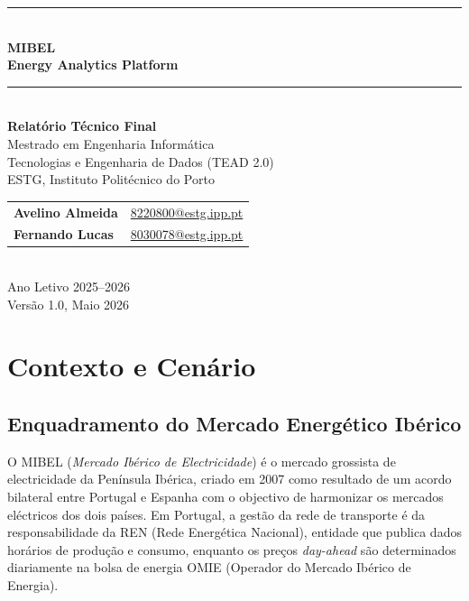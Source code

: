 \documentclass[11pt,a4paper]{article}
\begin{document}

\begin{titlepage}
  \centering
  \vspace*{2cm}
  {\color{mibel-blue}\rule{\linewidth}{1.5pt}}\\[0.4cm]
  {\Huge\bfseries\color{mibel-blue} MIBEL\\[0.3cm]
   \Large Energy Analytics Platform}\\[0.3cm]
  {\color{mibel-blue}\rule{\linewidth}{1.5pt}}\\[1.5cm]
  {\large\textbf{Relatório Técnico Final}}\\[0.5cm]
  {\large Mestrado em Engenharia Informática}\\
  {\large Tecnologias e Engenharia de Dados (TEAD 2.0)}\\[0.5cm]
  {\large ESTG, Instituto Politécnico do Porto}\\[1.5cm]
  \begin{tabular}{ll}
    \textbf{Avelino Almeida} & \href{mailto:8220800@estg.ipp.pt}{8220800@estg.ipp.pt} \\[0.3cm]
    \textbf{Fernando Lucas}  & \href{mailto:8030078@estg.ipp.pt}{8030078@estg.ipp.pt} \\
  \end{tabular}\\[2cm]
  {\large Ano Letivo 2025--2026}\\[1cm]
  \vfill
  {\small Versão 1.0, Maio 2026}
\end{titlepage}

\tableofcontents
\clearpage
{}

\section{Contexto e Cenário}

\subsection{Enquadramento do Mercado Energético Ibérico}

O MIBEL (\textit{Mercado Ibérico de Electricidade}) é o mercado grossista de electricidade da Península Ibérica, criado em 2007 como resultado de um acordo bilateral entre Portugal e Espanha com o objectivo de harmonizar os mercados eléctricos dos dois países. Em Portugal, a gestão da rede de transporte é da responsabilidade da REN (Rede Energética Nacional), entidade que publica dados horários de produção e consumo, enquanto os preços \textit{day-ahead} são determinados diariamente na bolsa de energia OMIE (Operador do Mercado Ibérico de Energia).
\end{document}
